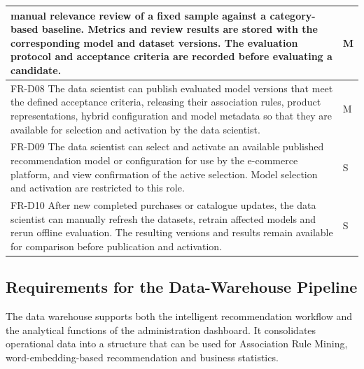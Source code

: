 \documentclass[a4paper,12pt]{article}
\newcommand{\req}[1]{\textsf{\small #1}}
\begin{document}
{\begin{longtable}{|L{\dimexpr\textwidth-2cm-4\arrayrulewidth\relax}|C{2cm}|}
  manual relevance review of a fixed sample against a category-based baseline. Metrics and review
  results are stored with the corresponding model and dataset versions. The evaluation protocol and
  acceptance criteria are recorded before evaluating a candidate. & M \\[3pt]\hline
  \req{FR-D08} The data scientist can publish evaluated model versions that meet the defined acceptance criteria,
  releasing their association rules, product representations, hybrid configuration and model metadata
  so that they are available for selection and activation by the data scientist. & M \\[3pt]\hline
  \req{FR-D09} The data scientist can select and activate an available published recommendation model or
  configuration for use by the e-commerce platform, and view confirmation of the active selection.
  Model selection and activation are restricted to this role. & S \\[3pt]\hline
  \req{FR-D10} After new completed purchases or catalogue updates, the data scientist can manually
  refresh the datasets, retrain affected models and rerun offline evaluation. The resulting versions
  and results remain available for comparison before publication and activation. & S \\[3pt]\hline
\end{longtable}
}


\subsection{Requirements for the Data-Warehouse Pipeline}

The data warehouse supports both the intelligent recommendation workflow and the analytical
functions of the administration dashboard. It consolidates operational data into a structure that
can be used for Association Rule Mining, word-embedding-based recommendation and business
statistics.
\end{document}

